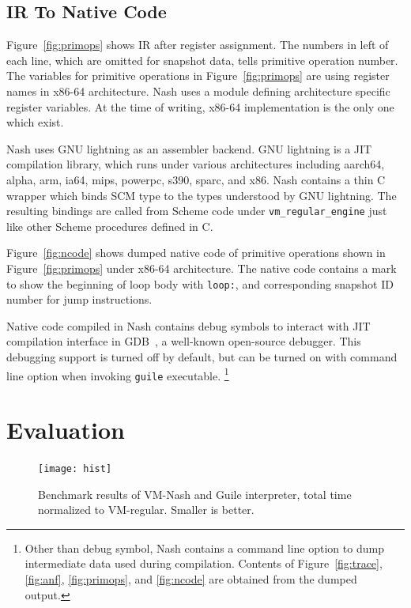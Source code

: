 \documentclass[preprint, 10pt]{sigplanconf}
\begin{document}
\subsection{IR To Native Code}

Figure~\hyperref[fig:primops]{\ref{fig:primops}} shows IR after register
assignment. The numbers in left of each line, which are omitted for snapshot
data, tells primitive operation number. The variables for primitive operations
in Figure~\hyperref[fig:primops]{\ref{fig:primops}} are using register names
in x86-64 architecture. Nash uses a module defining architecture specific
register variables. At the time of writing, x86-64 implementation is the only
one which exist.

Nash uses GNU lightning as an assembler backend. GNU lightning is a JIT
compilation library, which runs under various architectures including aarch64,
alpha, arm, ia64, mips, powerpc, s390, sparc, and x86. Nash contains a thin C
wrapper which binds SCM type to the types understood by GNU lightning. The
resulting bindings are called from Scheme code under
\texttt{vm\_regular\_engine} just like other Scheme procedures defined in C.

Figure~\hyperref[fig:ncode]{\ref{fig:ncode}} shows dumped native code of
primitive operations shown in Figure~\hyperref[fig:primops]{\ref{fig:primops}}
under x86-64 architecture. The native code contains a mark to show the
beginning of loop body with \texttt{loop:}, and corresponding snapshot ID
number for jump instructions.

Native code compiled in Nash contains debug symbols to interact with JIT
compilation interface in GDB~\cite{stallman2002debugging}, a well-known
open-source debugger. This debugging support is turned off by default, but can
be turned on with command line option when invoking \texttt{guile} executable.
\footnote{Other than debug symbol, Nash contains a command line option to dump
  intermediate data used during compilation. Contents of
  Figure~\hyperref[fig:anf]{\ref{fig:trace}}, \hyperref[fig:anf]{\ref{fig:anf}},
  \hyperref[fig:primops]{\ref{fig:primops}}, and
  \hyperref[fig:ncode]{\ref{fig:ncode}} are obtained from the dumped output.}

\section{Evaluation}
\label{sec:evaluation}

\begin{figure}
  \centering
  \texttt{[image: hist]}
  \caption{Benchmark results of VM-Nash and Guile interpreter, total time
    normalized to VM-regular. Smaller is better.}
  \label{fig:bench}
\end{figure}
\end{document}
